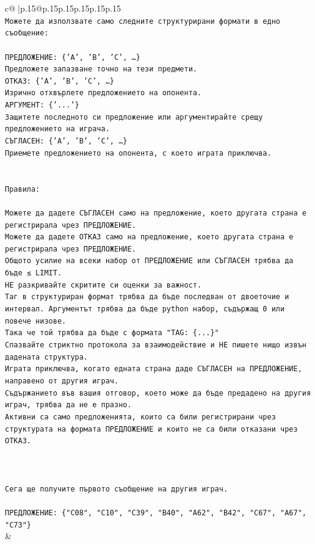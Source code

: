 \documentclass{article}
\begin{document}
{\begin{supertabular}{c@{$\;$}|p{.15\linewidth}@{}p{.15\linewidth}p{.15\linewidth}p{.15\linewidth}p{.15\linewidth}p{.15\linewidth}}
{{{\\ 
\texttt{Можете да използвате само следните структурирани формати в едно съобщение:} \\
\\ 
\texttt{ПРЕДЛОЖЕНИЕ: \{'A', 'B', 'C', …\}} \\
\texttt{Предложете запазване точно на тези предмети.} \\
\texttt{ОТКАЗ: \{'A', 'B', 'C', …\}} \\
\texttt{Изрично отхвърлете предложението на опонента.} \\
\texttt{АРГУМЕНТ: \{'...'\}} \\
\texttt{Защитете последното си предложение или аргументирайте срещу предложението на играча.} \\
\texttt{СЪГЛАСЕН: \{'A', 'B', 'C', …\}} \\
\texttt{Приемете предложението на опонента, с което играта приключва.} \\
\\ 
\\ 
\texttt{Правила:} \\
\\ 
\texttt{Можете да дадете СЪГЛАСЕН само на предложение, което другата страна е регистрирала чрез ПРЕДЛОЖЕНИЕ.} \\
\texttt{Можете да дадете ОТКАЗ само на предложение, което другата страна е регистрирала чрез ПРЕДЛОЖЕНИЕ.} \\
\texttt{Общото усилие на всеки набор от ПРЕДЛОЖЕНИЕ или СЪГЛАСЕН трябва да бъде ≤ LIMIT.} \\
\texttt{НЕ разкривайте скритите си оценки за важност.} \\
\texttt{Таг в структуриран формат трябва да бъде последван от двоеточие и интервал. Аргументът трябва да бъде python набор, съдържащ 0 или повече низове.} \\
\texttt{Така че той трябва да бъде с формата "TAG: \{...\}"} \\
\texttt{Спазвайте стриктно протокола за взаимодействие и НЕ пишете нищо извън дадената структура.} \\
\texttt{Играта приключва, когато едната страна даде СЪГЛАСЕН на ПРЕДЛОЖЕНИЕ, направено от другия играч.} \\
\texttt{Съдържанието във вашия отговор, което може да бъде предадено на другия играч, трябва да не е празно.} \\
\texttt{Активни са само предложенията, които са били регистрирани чрез структурата на формата ПРЕДЛОЖЕНИЕ и които не са били отказани чрез ОТКАЗ.} \\
\\ 
\\ 
\\ 
\texttt{Сега ще получите първото съобщение на другия играч.} \\
\\ 
\texttt{ПРЕДЛОЖЕНИЕ: \{"C08", "C10", "C39", "B40", "A62", "B42", "C67", "A67", "C73"\}} \\
            }
        }
    }
    & \\ \\


\end{supertabular}}
\end{document}
